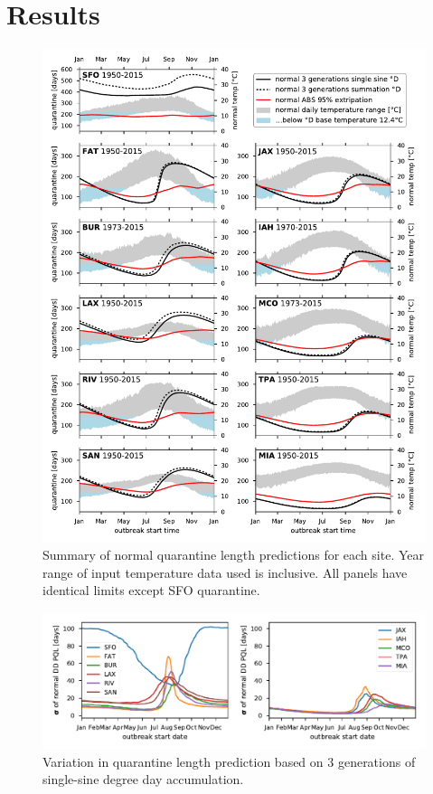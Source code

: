 \documentclass[10pt,a4paper,twocolumn]{article}
\begin{document}
\section*{Results}

\begin{figure}[htp!] %
\centering
\includegraphics{figs/fig_main.pdf}
\caption{\label{fig:main_summary}Summary of normal quarantine length predictions for each site.
Year range of input temperature data used is inclusive.
All panels have identical limits except SFO quarantine.}
\end{figure}

\begin{figure}[ht!]
\centering
\includegraphics{figs/fig_BMDD_variation.pdf}
\caption{\label{fig:DD_variation_summary}Variation in quarantine length prediction 
based on 3 generations of single-sine degree day accumulation.}
\end{figure}
\end{document}
